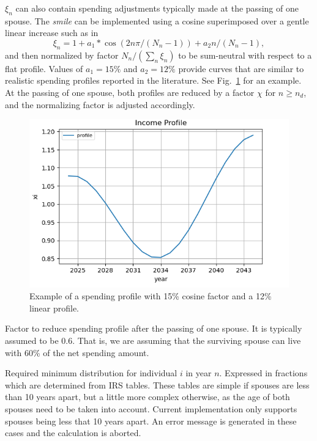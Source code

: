 \documentclass{report}[fleqn,11pt]
\begin{document}
\begin{description}[leftmargin=4em,style=multiline]
	$\xi_n$ can also contain spending adjustments typically made at the passing of one spouse.
	The {\em smile} can be implemented using a cosine superimposed over a gentle linear increase
	such as in
	\begin{equation}
		\xi_n = 1 + a_1*\cos(2n\pi/(N_n-1)) + a_2n/(N_n-1),
	\end{equation}
	and then normalized by factor $N_n/(\sum_n \xi_n )$ to be sum-neutral with respect to a flat profile.
	Values of $a_1 = 15\%$ and $a_2=12\%$ provide curves that are similar to realistic
		spending profiles reported in the literature. See Fig.~\ref{Fig:profile} for an example.
	At the passing of one spouse, both profiles are reduced by a factor $\chi$ for $n \ge n_d$,
	and the normalizing factor is adjusted accordingly.
	\begin{figure}[t]
	    \includegraphics{profile.png}
	    \caption{\small Example of a spending profile with 15\% cosine factor and a 12\% linear
	    profile. \label{Fig:profile}}
	\end{figure}
\item [$\chi$]
	Factor to reduce spending profile after the passing of one spouse. It is typically
	assumed to be 0.6. That is, we are assuming that the surviving spouse can live with
	60\% of the net spending amount.
\item [$\rho_{in}$]
	Required minimum distribution for individual $i$ in year $n$. Expressed in fractions
	which are determined from IRS tables. These tables are simple if spouses are less than 10 years apart,
	but a little more complex otherwise, as the age of both spouses need to be taken into account.
	Current implementation only supports spouses being less that 10 years apart.
	An error message is generated in these cases and the calculation is aborted.

\end{description}
\end{document}
